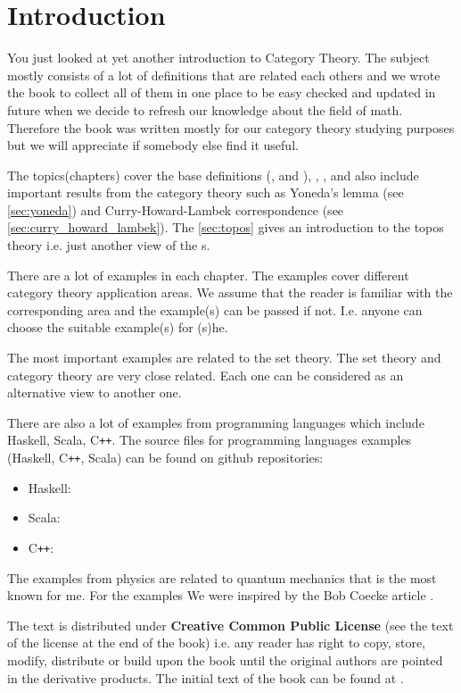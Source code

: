 \chapter*{Introduction}

You just looked at yet another introduction to Category Theory. The
subject mostly consists of a lot of definitions that are related each
others and we wrote the book to collect all of them in one
place to be easy checked and updated in future when we decide to refresh
our knowledge about the field of math. Therefore the book was written mostly
for our category theory studying purposes but we will appreciate if
somebody else find it useful. 

The topics(chapters) cover the base definitions
(,  and
), ,
,  and also include important
results from the category theory such as Yoneda's lemma (see
\cref{sec:yoneda}) and Curry-Howard-Lambek correspondence (see
\cref{sec:curry_howard_lambek}). The \cref{sec:topos} gives an
introduction to the topos theory i.e. just another view of the
s.

There are a lot of examples in each chapter. The examples cover different category
theory application areas. We assume that the reader is familiar with
the corresponding area and the example(s) can be passed if not. I.e.
anyone can choose the suitable example(s) for (s)he. 

The most important examples are related to the set theory. The set
theory and category theory are very close related. Each one can be
considered as an alternative view to another one.

There are also a lot of examples from programming languages which include
Haskell, Scala, C\texttt{++}. The source files for programming languages 
examples (Haskell, C\texttt{++}, Scala) can be found on github repositories:
\begin{itemize}
\item Haskell: \cite{github:cattheory_hs_examples}
\item Scala: \cite{github:cattheory_scala_examples}
\item C\texttt{++}: \cite{github:cattheory_cpp_examples}
\end{itemize}

The examples from physics are related to quantum mechanics that is the
most known for me. For the examples We were inspired by the Bob Coecke
article \cite{bib:arxiv:Bob_Coecke_2008}.

The text is distributed under \textbf{Creative Common Public License}
(see the text of the license at the end of the book)
i.e. any reader has right to copy, store, modify, distribute or build
upon the book until the original authors are pointed in the derivative
products. The initial text of the book can be found at
\cite{github:cattheory_ivanmurashko}.  
